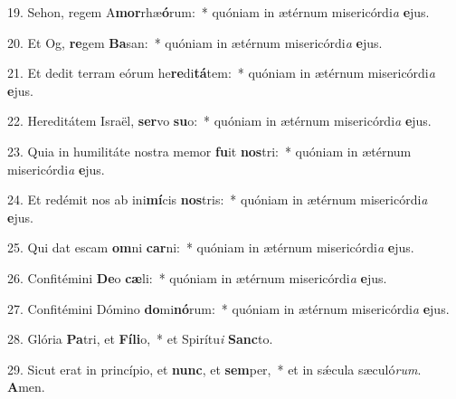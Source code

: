 19. Sehon, regem A\textbf{mor}rhæ\textbf{ó}rum:~*  quóniam in ætérnum misericórdi\textit{a} \textbf{e}jus.\

20. Et Og, \textbf{re}gem \textbf{Ba}san:~*  quóniam in ætérnum misericórdi\textit{a} \textbf{e}jus.\

21. Et dedit terram eórum he\textbf{re}di\textbf{tá}tem:~*  quóniam in ætérnum misericórdi\textit{a} \textbf{e}jus.\

22. Hereditátem Israël, \textbf{ser}vo \textbf{su}o:~*  quóniam in ætérnum misericórdi\textit{a} \textbf{e}jus.\

23. Quia in humilitáte nostra memor \textbf{fu}it \textbf{nos}tri:~*  quóniam in ætérnum misericórdi\textit{a} \textbf{e}jus.\

24. Et redémit nos ab ini\textbf{mí}cis \textbf{nos}tris:~*  quóniam in ætérnum misericórdi\textit{a} \textbf{e}jus.\

25. Qui dat escam \textbf{om}ni \textbf{car}ni:~*  quóniam in ætérnum misericórdi\textit{a} \textbf{e}jus.\

26. Confitémini \textbf{De}o \textbf{cæ}li:~*  quóniam in ætérnum misericórdi\textit{a} \textbf{e}jus.\

27. Confitémini Dómino \textbf{do}mi\textbf{nó}rum:~*  quóniam in ætérnum misericórdi\textit{a} \textbf{e}jus.\

28. Glória \textbf{Pa}tri, et \textbf{Fí}\textbf{li}o,~*  et Spirítu\textit{i} \textbf{Sanc}to.\

29. Sicut erat in princípio, et \textbf{nunc}, et \textbf{sem}per,~*  et in sǽcula sæculó\textit{rum}. \textbf{A}men.\

